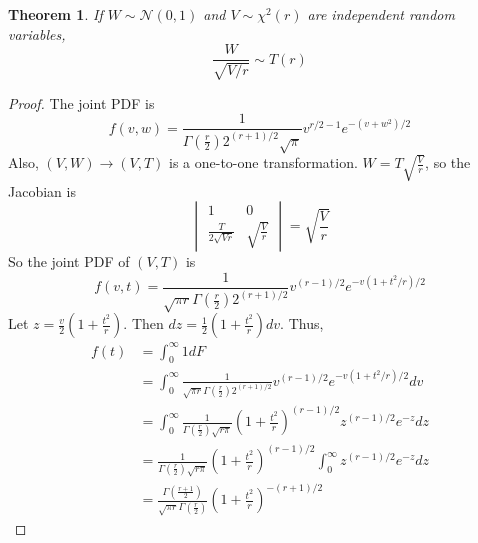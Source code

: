 \documentclass{article}
\newtheorem{theorem}{Theorem}
\theoremstyle{definition}\newtheorem{definition}{DEF}
\theoremstyle{definition}\newtheorem{example}{Ex}
\theoremstyle{lemma}\newtheorem{lemma}{Lemma}
\theoremstyle{corrolary}\newtheorem{corrolary}{Cor}
\begin{document}
\begin{theorem}
If $W\sim \mathcal{N}(0,1)$ and $V\sim \chi^2(r)$ are independent random variables,
\begin{equation}
\frac{W}{\sqrt{V/r}}\sim T(r)
\end{equation}
\end{theorem}
\begin{proof}
The joint PDF is 
\begin{equation*}
f(v,w)=\frac{1}{\Gamma\left( \frac{r}{2}\right)2^{(r+1)/2}\sqrt{\pi}} v^{r/2-1} e^{-(v+w^2)/2}
\end{equation*}
Also, $(V,W)\rightarrow(V, T)$ is a one-to-one transformation.
$W=T\sqrt{\frac{V}{r}}$, so the Jacobian is
\begin{equation*}
\begin{vmatrix}
1 & 0\\
\frac{T}{2\sqrt{Vr}} & \sqrt{\frac{V}{r}}
\end{vmatrix}
=\sqrt{\frac{V}{r}}
\end{equation*}
So the joint PDF of $(V,T)$ is
\begin{equation*}
f(v,t)=\frac{1}{\sqrt{\pi r}\Gamma\left( \frac{r}{2}\right) 2^{(r+1)/2}} v^{(r-1)/2}e^{-v(1+t^2/r)/2}
\end{equation*}
Let $z=\frac{v}{2}\left(1+\frac{t^2}{r}\right)$.
Then $dz=\frac{1}{2}\left( 1+\frac{t^2}{r}\right)dv$.
Thus,
\begin{align*}
f(t)&=\int_0^\infty 1dF\\
&=\int_0^\infty \frac{1}{\sqrt{\pi r}\Gamma\left( \frac{r}{2}\right) 2^{(r+1)/2}} v^{(r-1)/2}e^{-v(1+t^2/r)/2} dv\\
&=\int_0^\infty \frac{1}{\Gamma \left(\frac{r}{2}\right) \sqrt{r\pi}} \left( 1+\frac{t^2}{r}\right)^{(r-1)/2} z^{(r-1)/2} e^{-z} dz\\
&=\frac{1}{\Gamma \left(\frac{r}{2}\right) \sqrt{r\pi}} \left( 1+\frac{t^2}{r}\right)^{(r-1)/2} \int_0^\infty  z^{(r-1)/2} e^{-z} dz\\
&=\frac{\Gamma \left( \frac{r+1}{2}\right)}{\sqrt{\pi r}\Gamma\left(\frac{r}{2} \right)}\left( 1+\frac{t^2}{r}\right)^{-(r+1)/2}
\end{align*}
\end{proof}
\end{document}

